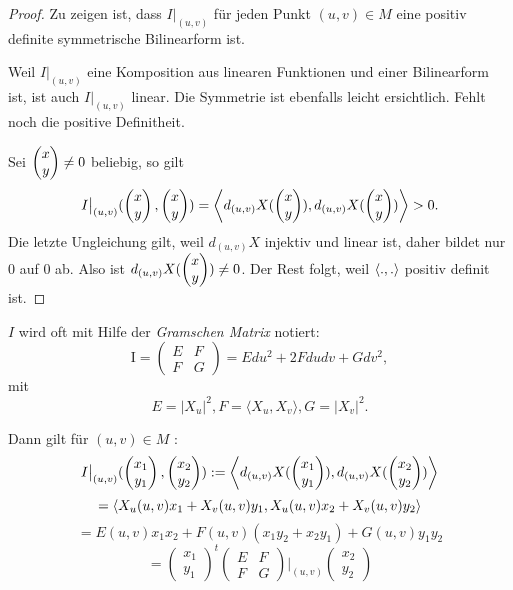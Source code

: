 \begin{proof}
	Zu zeigen ist, dass $I\big| _{(u,v)}$ für jeden Punkt $(u,v)\in M$ eine positiv definite symmetrische Bilinearform ist. 
	
	Weil $ I\big| _{(u,v)} $ eine Komposition aus linearen Funktionen und einer Bilinearform ist, ist auch $I\big| _{(u,v)}$ linear. Die Symmetrie ist ebenfalls leicht ersichtlich. Fehlt noch die positive Definitheit.
	
	Sei $\begin{pmatrix} x\\y \end{pmatrix} \neq 0$ beliebig, so gilt
		\[ I\big| _{(u,v)}(\begin{pmatrix} x\\y \end{pmatrix},\begin{pmatrix} x\\y \end{pmatrix})
			= \left \langle d_{(u,v)}X(\begin{pmatrix} x\\y \end{pmatrix}),d_{(u,v)}X(\begin{pmatrix} x\\y \end{pmatrix}) \right\rangle> 0. \]
	Die letzte Ungleichung gilt, weil $d_{(u,v)}X$ injektiv und linear ist, daher bildet nur $0$ auf $0$ ab. Also ist $d_{(u,v)}X(\begin{pmatrix} x\\y \end{pmatrix})\neq 0$. Der Rest folgt, weil $\left \langle .,. \right\rangle$ positiv definit ist.
\end{proof}

\begin{remark}
	
	$I$ wird oft mit Hilfe der \emph{Gramschen Matrix} notiert: \[ \mathrm{I} = \begin{pmatrix}
	E & F\\
	F & G
	\end{pmatrix} = E du^2 + 2Fdudv + Gdv^2, \] mit
	\[ E=|X_u|^2, F = \langle X_u,X_v \rangle, G = |X_v|^2.  \]
	


Dann gilt für $ (u,v) \in M$ : \[ I \big|_{(u,v)}(\begin{pmatrix}
x_1 \\
y_1
\end{pmatrix},\begin{pmatrix}
x_2 \\
y_2
\end{pmatrix}) := \left \langle  d_{(u,v)}X(\begin{pmatrix}
x_1 \\
y_1
\end{pmatrix}),  d_{(u,v)}X(\begin{pmatrix}
x_2 \\
y_2
\end{pmatrix})  \right\rangle \] \[= \left \langle  X_u(u,v)x_1 + X_v(u,v)y_1, X_u(u,v)x_2 + X_v(u,v)y_2  \right\rangle \]
\[ = E(u,v)x_1x_2 + F(u,v)(x_1y_2 + x_2y_1) + G(u,v)y_1y_2 \]
\[ = \begin{pmatrix}
x_1 \\
y_1
\end{pmatrix}^t \begin{pmatrix}
E & F \\ 
F & G
\end{pmatrix}\Bigg|_{(u,v)} \begin{pmatrix}
x_2\\
y_2
\end{pmatrix} \]

\end{remark}


